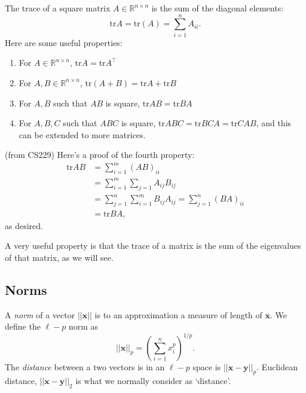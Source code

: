 \documentclass{article}
\newcommand{\1}{\mathbf{1}}
\newcommand{\tr}{\mathrm{tr}}
\newcommand{\0}{\mathbf{0}}
\newcommand{\xx}{\mathbf{x}}
\newcommand{\yy}{\mathbf{y}}
\newcommand{\RR}{\mathbb{R}}
\newcommand{\T}{\top}
\begin{document}
The trace of a square matrix $A\in\RR^{n\times n}$ is the sum of the diagonal
elements:
\[
    \tr A = \tr(A) = \sum_{i=1}^n A_{ii}.
\]
Here are some useful properties:
\begin{enumerate}[-]
\item For $A\in\RR^{n\times n}$, $\tr A = \tr A^\T$
\item For $A,B\in\RR^{n\times n}$, $\tr(A+B) = \tr A + \tr B$
\item For $A,B$ such that $AB$ is square, $\tr AB = \tr BA$
\item For $A,B,C$ such that $ABC$ is square, $\tr ABC = \tr BCA
    = \tr CAB$, and this can be extended to more matrices.
\end{enumerate}

(from CS229) Here's a proof of the fourth property:
\begin{align*}
    \tr AB &= \sum_{i=1}^m(AB)_{ii}\\
    &= \sum_{i=1}^m\sum_{j=1} A_{ij}B_{ij}\\
    &= \sum_{j=1}^n\sum_{i=1}^m B_{ij}A_{ij} = \sum_{j=1}^n (BA)_{ii}\\
    &= \tr BA,
\end{align*}
as desired.

A very useful property is that the trace of a matrix is the sum
of the eigenvalues of that matrix, as we will see.

\subsection{Norms}

A \textit{norm} of a vector $||\xx||$ is to an approximation a measure of
length of $\xx$. We define the $\ell-p$ norm as
\[
    ||\xx||_p = \left( \sum_{i=1}^n x_i^p \right)^{1/p}.
\]
The \textit{distance} between a two vectors is in an $\ell-p$ space
is $||\xx-\yy||_p$. Euclidean distance, $||\xx-\yy||_2$ is what we normally
consider as `distance'.
\end{document}
